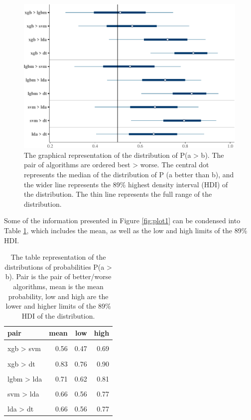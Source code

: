 \documentclass[twoside,11pt,preprint]{article}
\begin{document}
\begin{figure}
\includegraphics[width=0.7\linewidth]{figure-latex/xplot1-1} \caption{\label{fig:plot1}The graphical representation of the distribution of P(a > b). The pair of algorithms are ordered best > worse. The central dot represents the median of the distribution of P (a better than b), and the wider line represents the 89\% highest density interval (HDI) of the distribution. The thin line represents the full range of the distribution.}\label{fig:xplot1}
\end{figure}

Some of the information presented in Figure \ref{fig:plot1} can be condensed into Table \ref{tab:main1}, which includes the mean, as well as the low and high limits of the 89\% HDI.

\begin{table}

\caption{\label{tab:xresume1}\label{tab:main1}The table representation of the distributions of probabilities P(a > b). Pair is the pair of better/worse algorithms, mean is the mean probability, low and high are the lower and higher limits of the 89\% HDI of the distribution.}
\centering
\begin{tabular}[t]{lrrr}
\toprule
\textbf{pair} & \textbf{mean} & \textbf{low} & \textbf{high}\\
\midrule
\cellcolor{gray!6}{xgb > lgbm} & \cellcolor{gray!6}{0.51} & \cellcolor{gray!6}{0.40} & \cellcolor{gray!6}{0.63}\\
xgb > svm & 0.56 & 0.47 & 0.69\\
\cellcolor{gray!6}{xgb > lda} & \cellcolor{gray!6}{0.72} & \cellcolor{gray!6}{0.62} & \cellcolor{gray!6}{0.81}\\
xgb > dt & 0.83 & 0.76 & 0.90\\
\cellcolor{gray!6}{lgbm > svm} & \cellcolor{gray!6}{0.55} & \cellcolor{gray!6}{0.43} & \cellcolor{gray!6}{0.66}\\
\addlinespace
lgbm > lda & 0.71 & 0.62 & 0.81\\
\cellcolor{gray!6}{lgbm > dt} & \cellcolor{gray!6}{0.82} & \cellcolor{gray!6}{0.76} & \cellcolor{gray!6}{0.90}\\
svm > lda & 0.66 & 0.56 & 0.77\\
\cellcolor{gray!6}{svm > dt} & \cellcolor{gray!6}{0.79} & \cellcolor{gray!6}{0.71} & \cellcolor{gray!6}{0.87}\\
lda > dt & 0.66 & 0.56 & 0.77\\
\bottomrule
\end{tabular}
\end{table}
\end{document}
